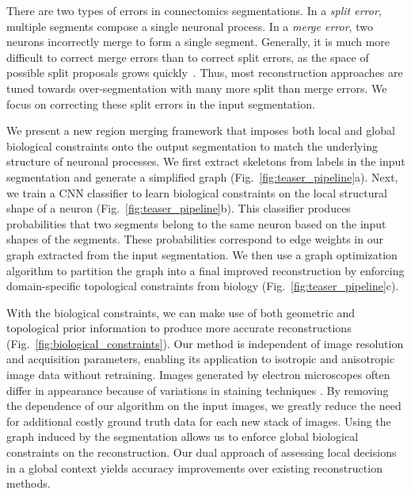 There are two types of errors in connectomics segmentations.
In a \textit{split error}, multiple segments compose a single neuronal process. 
In a \textit{merge error}, two neurons incorrectly merge to form a single segment. 
Generally, it is much more difficult to correct merge errors than to correct split errors, as the space of possible split proposals grows quickly~\cite{parag2015properties}.
Thus, most reconstruction approaches are tuned towards over-segmentation with many more split than merge errors.
We focus on correcting these split errors in the input segmentation.

We present a new region merging framework that imposes both local and global biological constraints onto the output segmentation to match the underlying structure of neuronal processes.
We first extract skeletons from labels in the input segmentation and generate a simplified graph (Fig.~\ref{fig:teaser_pipeline}a). 
Next, we train a CNN classifier to learn biological constraints on the local structural shape of a neuron (Fig.~\ref{fig:teaser_pipeline}b).
This classifier produces probabilities that two segments belong to the same neuron based on the input shapes of the segments.
These probabilities correspond to edge weights in our graph extracted from the input segmentation.
We then use a graph optimization algorithm to partition the graph into a final improved reconstruction by enforcing domain-specific topological constraints from biology (Fig.~\ref{fig:teaser_pipeline}c).

With the biological constraints, we can make use of both geometric and topological prior information to produce more accurate reconstructions (Fig.~\ref{fig:biological_constraints}).
Our method is independent of image resolution and acquisition parameters, enabling its application to isotropic and anisotropic image data without retraining.
Images generated by electron microscopes often differ in appearance because of variations in staining techniques \cite{briggman2012volume}.
By removing the dependence of our algorithm on the input images, we greatly reduce the need for additional costly ground truth data for each new stack of images.
Using the graph induced by the segmentation allows us to enforce global biological constraints on the reconstruction. 
Our dual approach of assessing local decisions in a global context yields accuracy improvements over existing reconstruction methods.


